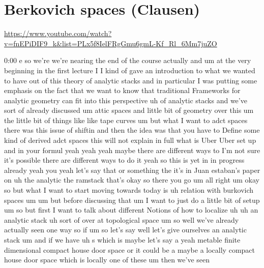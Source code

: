
\section{\ufs Berkovich spaces (Clausen)}

\url{https://www.youtube.com/watch?v=fnEPiDIF9_k&list=PLx5f8IelFRgGmu6gmL-Kf_Rl_6Mm7juZO}
\renewcommand{\yt}[2]{\href{https://www.youtube.com/watch?v=fnEPiDIF9_k&list=PLx5f8IelFRgGmu6gmL-Kf_Rl_6Mm7juZO&t=#1}{#2}}
\vspace{1em}

\begin{unfinished}{0:00}
  e
so  we're  we're  nearing  the  end  of  the
course  actually  and  um  at  the  very
beginning  in  the  first  lecture  I  I  kind
of  gave  an  introduction  to  what  we
wanted  to  have  out  of  this  theory  of
analytic  stacks  and  in  particular  I  was
putting  some  emphasis  on  the  fact  that
we  want  to  know  that  traditional
Frameworks  for  analytic  geometry  can  fit
into  this  perspective  uh  of  analytic
stacks  and  we've  sort  of  already
discussed  um  attic
spaces  and  little  bit  of  geometry  over
this  um  the  little  bit  of  things  like
like  tape
curves  um  but  what  I  want  to  adct  spaces
there  was  this  issue  of  shiftin  and  then
the  idea  was  that  you  have  to  Define
some  kind  of  derived  adct  spaces  this
will  not  explain  in  full  what  is  Uber
Uber  set  up  and  in  your  formul  yeah  yeah
yeah  maybe  there  are  different  ways  to
I'm  not  sure  it's  possible  there  are
different  ways  to  do  it  yeah  so  this  is
yet  in  in  progress  already  yeah  you  yeah
let's  say
that  or  something
the  it's  in  Juan  estaban's  paper  on  uh
the  analytic  the
ramstack  that's  okay  so  there  you  go  um
all  right  um  okay  so  but  what  I  want  to
start  moving  towards  today  is  uh
relation  with  burkovich
spaces
um
um  but  before  discussing  that  um  I  want
to  just  do  a  little  bit  of  setup  um  so
but
first  I  want  to  talk  about  different
Notions  of  how  to  localize
uh  uh  an  analytic
stack  uh  sort  of  over  at  topological
space  um  so  well  we've  already  actually
seen  one  way  so  if  um  so  let's  say  well
let's  give  ourselves  an  analytic  stack
um  and  if  we  have  uh  s  which  is  maybe
let's  say  a  yeah
metable  finite  dimensional  compact  house
door  space  or  it  could  be  a  maybe  a
locally  compact  house  door  space  which
is
locally  one  of  these  um  then  we've  seen

\end{unfinished}
